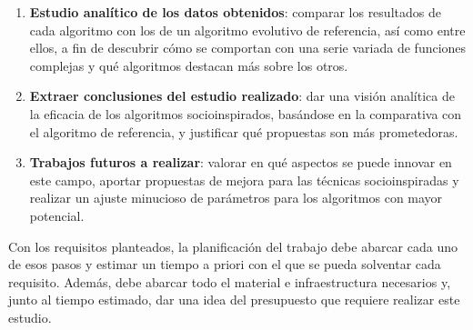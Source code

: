 \begin{enumerate}
	\item{\textbf{Estudio analítico de los datos obtenidos}: comparar los resultados de cada algoritmo con los de un algoritmo evolutivo de referencia, así como entre ellos, a fin de descubrir cómo se comportan con una serie variada de funciones complejas y qué algoritmos destacan más sobre los otros.}
	\item{\textbf{Extraer conclusiones del estudio realizado}: dar una visión analítica de la eficacia de los algoritmos socioinspirados, basándose en la comparativa con el algoritmo de referencia, y justificar qué propuestas son más prometedoras.}
	\item{\textbf{Trabajos futuros a realizar}: valorar en qué aspectos se puede innovar en este campo, aportar propuestas de mejora para las técnicas socioinspiradas y realizar un ajuste minucioso de parámetros para los algoritmos con mayor potencial.}
\end{enumerate}

Con los requisitos planteados, la planificación del trabajo debe abarcar cada uno de esos pasos y estimar un tiempo a priori con el que se pueda solventar cada requisito. Además, debe abarcar todo el material e infraestructura necesarios y, junto al tiempo estimado, dar una idea del presupuesto que requiere realizar este estudio.